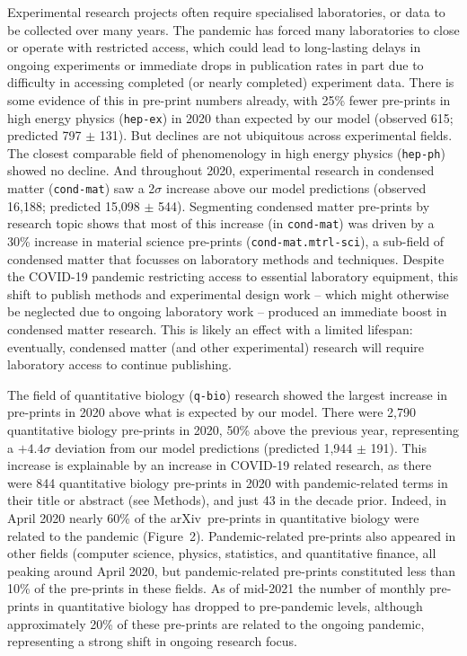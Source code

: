 \documentclass[a4paper,12pt]{article}
\newcommand{\arxiv}{arXiv}
\begin{document}
Experimental research projects often require specialised laboratories, or data to be collected over many years. The pandemic has forced many laboratories to close or operate with restricted access, which could lead to long-lasting delays in ongoing experiments or immediate drops in publication rates in part due to difficulty in accessing completed (or nearly completed) experiment data. There is some evidence of this in pre-print numbers already, with {25\%} fewer pre-prints in high energy physics (\texttt{hep-ex}) in 2020 than expected by our model (observed 615; predicted 797 $\pm$ 131). But declines are not ubiquitous across experimental fields. The closest comparable field of phenomenology in high energy physics (\texttt{hep-ph}) showed no decline. And throughout 2020, experimental research in condensed matter (\texttt{cond-mat}) saw a 2$\sigma$ increase above our model predictions (observed 16,188; predicted 15,098 $\pm$ 544). Segmenting condensed matter pre-prints by research topic shows that most of this increase (in \texttt{cond-mat}) was driven by a 30\% increase in material science pre-prints (\texttt{cond-mat.mtrl-sci}), a sub-field of condensed matter that focusses on laboratory methods and techniques. Despite the COVID-19 pandemic restricting access to essential laboratory equipment, this shift to publish methods and experimental design work -- which might otherwise be neglected due to ongoing laboratory work -- produced an immediate boost in condensed matter research. This is likely an effect with a limited lifespan: eventually, condensed matter (and other experimental) research will require laboratory access to continue publishing.

The field of quantitative biology (\texttt{q-bio}) research showed the largest increase in pre-prints in 2020 above what is expected by our model. There were {2,790} quantitative biology pre-prints in 2020, {50\%} above the previous year, representing a $+4.4\sigma$ deviation from our model predictions (predicted 1,944 $\pm$ 191). This increase is explainable by an increase in COVID-19 related research, as there were 844 quantitative biology pre-prints in 2020 with pandemic-related terms in their title or abstract (see Methods), and just 43 in the decade prior. Indeed, in {April 2020} nearly 60\% of the \arxiv\ pre-prints in quantitative biology were related to the pandemic (Figure~2). Pandemic-related pre-prints also appeared in other fields (computer science, physics, statistics, and quantitative finance, all peaking around {April 2020}, but pandemic-related pre-prints constituted less than 10\% of the pre-prints in these fields. As of mid-2021 the number of monthly pre-prints in quantitative biology has dropped to pre-pandemic levels, although approximately 20\% of these pre-prints are related to the ongoing pandemic, representing a strong shift in ongoing research focus.
 
\end{document}
